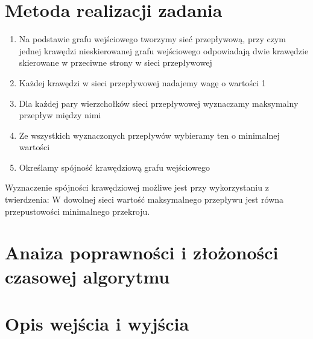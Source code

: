 \documentclass{article}
\begin{document}
\section{Metoda realizacji zadania}

\begin{enumerate}
\item Na podstawie grafu wejściowego tworzymy sieć przepływową, przy czym jednej krawędzi nieskierowanej grafu wejściowego odpowiadają dwie krawędzie skierowane w przeciwne strony w sieci przepływowej
\item Każdej krawędzi w sieci przepływowej nadajemy wagę o wartości 1
\item Dla każdej pary wierzchołków sieci przepływowej wyznaczamy maksymalny przepływ między nimi
\item Ze wszystkich wyznaczonych przepływów wybieramy ten o minimalnej wartości
\item Określamy spójność krawędziową grafu wejściowego
\end{enumerate}


Wyznaczenie spójności krawędziowej możliwe jest przy wykorzystaniu z twierdzenia:
W dowolnej sieci wartość maksymalnego przepływu jest równa przepustowości minimalnego przekroju.

\section{Anaiza poprawności i złożoności czasowej algorytmu}

\section{Opis wejścia i wyjścia}
\end{document}
